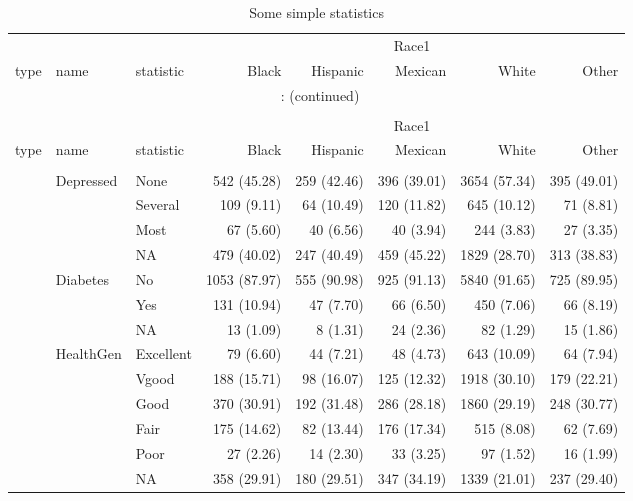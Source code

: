 \documentclass{article}
\begin{document}
\hypertarget{Some simple statistics}{} 
\begingroup\footnotesize\begin{longtable}{lllrrrrr}
\caption{Some simple statistics}\\
\toprule
&&&
\multicolumn{ 5 }{c}{ Race1 } \\
\cmidrule(lr){4-8}
type & name & statistic & Black & Hispanic & Mexican & White & Other \\
\hline
\endfirsthead
\multicolumn{8}{c}{\tablename~\thetable{}: (continued)}\\\\
\toprule
&&&
\multicolumn{ 5 }{c}{ Race1 } \\
\cmidrule(lr){4-8}
type & name & statistic & Black & Hispanic & Mexican & White & Other \\
\hline
\endhead \hline \endfoot \hline
\endlastfoot
\multicolumn{ 7 }{l}{\textit{ categorical }}\\
& Depressed & None & 542  (45.28) & 259  (42.46) & 396  (39.01) & 3654 (57.34) & 395  (49.01) \\
 &  & Several & 109  (9.11) & 64   (10.49) & 120  (11.82) & 645  (10.12) & 71   (8.81) \\
 &  & Most & 67   (5.60) & 40   (6.56) & 40   (3.94) & 244  (3.83) & 27   (3.35) \\
 &  & NA & 479  (40.02) & 247  (40.49) & 459  (45.22) & 1829 (28.70) & 313  (38.83) \\
[2ex]
 & Diabetes & No & 1053 (87.97) & 555  (90.98) & 925  (91.13) & 5840 (91.65) & 725  (89.95) \\
 &  & Yes & 131  (10.94) & 47   (7.70) & 66   (6.50) & 450  (7.06) & 66   (8.19) \\
 &  & NA & 13   (1.09) & 8    (1.31) & 24   (2.36) & 82   (1.29) & 15   (1.86) \\
[2ex]
 & HealthGen & Excellent & 79   (6.60) & 44   (7.21) & 48   (4.73) & 643  (10.09) & 64   (7.94) \\
 &  & Vgood & 188  (15.71) & 98   (16.07) & 125  (12.32) & 1918 (30.10) & 179  (22.21) \\
 &  & Good & 370  (30.91) & 192  (31.48) & 286  (28.18) & 1860 (29.19) & 248  (30.77) \\
 &  & Fair & 175  (14.62) & 82   (13.44) & 176  (17.34) & 515  (8.08) & 62   (7.69) \\
 &  & Poor & 27   (2.26) & 14   (2.30) & 33   (3.25) & 97   (1.52) & 16   (1.99) \\
 &  & NA & 358  (29.91) & 180  (29.51) & 347  (34.19) & 1339 (21.01) & 237  (29.40) \\

\end{longtable}
\end{document}

